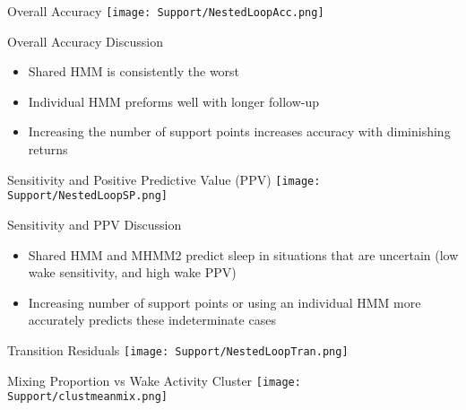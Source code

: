 \documentclass{beamer}
\begin{document}

\begin{frame}{Overall Accuracy}
\centering
\texttt{[image: Support/NestedLoopAcc.png]}

    
\end{frame}


\begin{frame}{Overall Accuracy Discussion}
    \begin{itemize}
        \item Shared HMM is consistently the worst
        \item Individual HMM preforms well with longer follow-up
        \item Increasing the number of support points increases accuracy with diminishing returns
    \end{itemize}
\end{frame}

\begin{frame}{Sensitivity and Positive Predictive Value (PPV)}
\centering
\texttt{[image: Support/NestedLoopSP.png]}

    
\end{frame}


\begin{frame}{Sensitivity and PPV Discussion}
    \begin{itemize}
        \item Shared HMM and MHMM2 predict sleep in situations that are uncertain (low wake sensitivity, and high wake PPV)
        \item Increasing number of support points or using an individual HMM more accurately predicts these indeterminate cases 
    \end{itemize}
\end{frame}


\begin{frame}{Transition Residuals}
\centering
\texttt{[image: Support/NestedLoopTran.png]}

    
\end{frame}





\begin{frame}{Mixing Proportion vs Wake Activity Cluster}
    \centering
    \texttt{[image: Support/clustmeanmix.png]}
    
        
    \end{frame}
    
\end{document}
